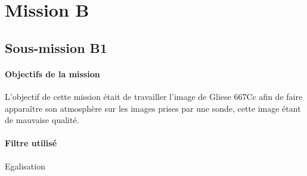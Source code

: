 \section{Mission B}
	\subsection{Sous-mission B1}

	\begin{vwcol}[widths={0.8,0.2}, rule=0pt]
	\begin{minipage}{0.7\textwidth}
	\paragraph{Objectifs de la mission}

	L'objectif de cette mission était de travailler l'image de Gliese 667Cc afin de faire apparaître son atmosphère sur les images prises par une sonde, cette image étant de mauvaise qualité. 
	\end{minipage}
	\begin{minipage}{0.2\textwidth}
		\begin{flushright}
			\paragraph{Filtre utilisé}
		Egalisation\up{\ref{Egalisation}}
		\end{flushright}
	\end{minipage}
	\end{vwcol} 

